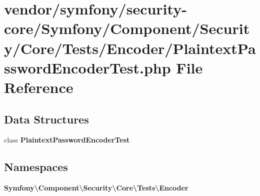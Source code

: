 \section{vendor/symfony/security-\/core/\+Symfony/\+Component/\+Security/\+Core/\+Tests/\+Encoder/\+Plaintext\+Password\+Encoder\+Test.php File Reference}
\label{_plaintext_password_encoder_test_8php}
\subsection*{Data Structures}
\begin{DoxyCompactItemize}
\item 
class {\bf Plaintext\+Password\+Encoder\+Test}
\end{DoxyCompactItemize}
\subsection*{Namespaces}
\begin{DoxyCompactItemize}
\item 
 {\bf Symfony\textbackslash{}\+Component\textbackslash{}\+Security\textbackslash{}\+Core\textbackslash{}\+Tests\textbackslash{}\+Encoder}
\end{DoxyCompactItemize}
